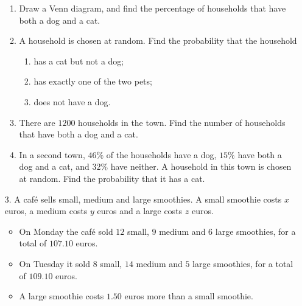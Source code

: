 \documentclass[12pt, twoside]{article}
\begin{document}
\begin{enumerate}[itemsep=0.15cm]
\begin{enumerate}[itemsep=0.1cm]
  \item Draw a Venn diagram, and find the percentage of households that have
  both a dog and a cat.
  \item A household is chosen at random. Find the probability that the
  household
  \begin{enumerate}[label=(\roman*), itemsep=0cm]
    \item has a cat but not a dog;
    \item has exactly one of the two pets;
    \item does not have a dog.
  \end{enumerate}
  \item There are $1200$ households in the town. Find the number of
  households that have both a dog and a cat.
  \item In a second town, $46\%$ of the households have a dog, $15\%$ have
  both a dog and a cat, and $32\%$ have neither. A household in this town
  is chosen at random. Find the probability that it has a cat.
\end{enumerate}


\newpage

\item[3.]
A caf\'e sells small, medium and large smoothies. A small smoothie costs
$x$ euros, a medium costs $y$ euros and a large costs $z$ euros.

\begin{itemize}[itemsep=0cm, topsep=0.1cm]
  \item On Monday the caf\'e sold $12$ small, $9$ medium and $6$ large
  smoothies, for a total of $107.10$ euros.
  \item On Tuesday it sold $8$ small, $14$ medium and $5$ large smoothies,
  for a total of $109.10$ euros.
  \item A large smoothie costs $1.50$ euros more than a small smoothie.
\end{itemize}


\end{enumerate}
\end{document}
